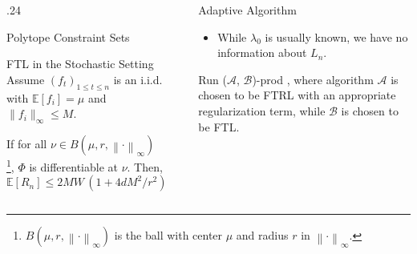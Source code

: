 \documentclass[final]{beamer} %
\newcommand{\cA}{\mathcal{A}}
\newcommand{\cB}{\mathcal{B}}
\newcommand{\Exp}[1]{\mathbb{E}\left[ #1 \right]}
\newcommand{\norm}[1]{\left\| #1 \right\|}
\begin{document}
\begin{frame}[c]
\begin{columns}[t,totalwidth=\textwidth]
\begin{column} {.24\textwidth}
\begin{block}{Polytope Constraint Sets }
			\begin{minipage}{.9\linewidth}
				\begin{block}{FTL in the Stochastic Setting}
					\vspace{-1cm}
					Assume  $(f_t)_{1\le t \le n}$ is an i.i.d. with $\Exp{f_i} = \mu$ and $\|f_i\|_\infty \le M$. 
					\vspace{1cm}
					\begin{tcolorbox}[title = \vspace{0.4cm}{Constant regret of FTL} \vspace{0.4cm}, title filled, colbacktitle = uofagreen!10, width = 0.9\textwidth, colback = uofagreen!10, colframe = red, coltitle = black, arc = 16pt]
						If for all $\nu \in B(\mu,r, \norm{\cdot}_\infty)$ \footnote{$ B(\mu,r, \norm{\cdot}_\infty)$ is the ball with center $\mu$ and radius $r$ in $\norm{\cdot}_\infty$.}, $\Phi$ is differentiable at $\nu$.
						Then,	
						$$\Exp{R_n} \le 2MW \, (1+4d M^2/r^2 )\,.$$
					\end{tcolorbox}
				\end{block}
			\end{minipage}
			\vspace{-0.3em}
		\end{block}
	
		
	\end{column}

	\begin{column}{0.01\textwidth}
	\end{column}
	\begin{column}{0.24\textwidth}
		\begin{block}{Adaptive Algorithm}
			\begin{itemize}
				\item While $\lambda_0$ is usually known, we have no information about $L_n$.
				\vspace{-1cm}
			\end{itemize}
			{}
			Run ($\cA$, $\cB$)-prod \citep{sani2014exploiting}, where algorithm
			$\cA$ is chosen to be FTRL with an appropriate regularization term, 
			while $\cB$ is chosen to be FTL. 
		\end{block}
		

\end{column}
\end{columns}
\end{frame}
\end{document}
